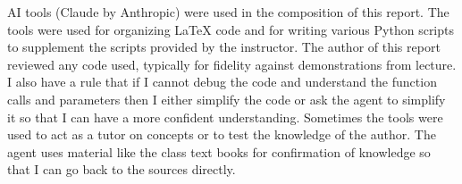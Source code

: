 \documentclass[11pt]{article}
\begin{document}
AI tools (Claude by Anthropic) were used in the composition of this report. The tools were used for organizing LaTeX code and for writing various Python scripts to supplement the
scripts provided by the instructor. The author of this report reviewed any code used, typically for fidelity against demonstrations from lecture. I also have a rule that if I cannot debug the code and understand the function calls and parameters then I either simplify the code or ask the agent to simplify it so that I can have a more confident understanding.
Sometimes the tools were used to act as a tutor on concepts or to test the knowledge of the author. The agent uses material like the class text books for confirmation of knowledge so that I can go back to the sources directly.
\end{document}
